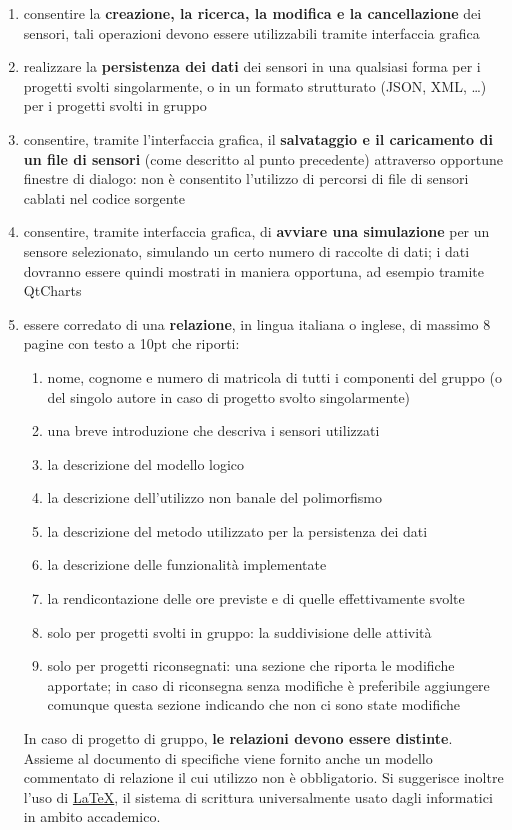 \documentclass[10pt,a4paper,oneside]{article}
\begin{document}
\begin{enumerate}
 \item consentire la \textbf{creazione, la ricerca, la modifica e la cancellazione} dei sensori, tali operazioni devono essere utilizzabili tramite interfaccia grafica
 \item realizzare la \textbf{persistenza dei dati} dei sensori in una qualsiasi forma per i progetti svolti singolarmente, o in un formato strutturato (JSON, XML, \ldots) per i progetti svolti in gruppo
 \item consentire, tramite l'interfaccia grafica, il \textbf{salvataggio e il caricamento di  un file di sensori} (come descritto al punto precedente) attraverso opportune finestre di dialogo: non è consentito l'utilizzo di percorsi di file di sensori cablati nel codice sorgente
 \item consentire, tramite interfaccia grafica, di \textbf{avviare una simulazione} per un sensore selezionato, simulando un certo numero di raccolte di dati; i dati dovranno essere quindi mostrati in maniera opportuna, ad esempio tramite QtCharts
 \item essere corredato di una \textbf{relazione}, in lingua italiana o inglese, di massimo 8 pagine con testo a 10pt che riporti:
 \begin{enumerate}
  \item nome, cognome e numero di matricola di tutti i componenti del gruppo (o del singolo autore in caso di progetto svolto singolarmente)
  \item una breve introduzione che descriva i sensori utilizzati
  \item la descrizione del modello logico
  \item la descrizione dell'utilizzo non banale del polimorfismo
  \item la descrizione del metodo utilizzato per la persistenza dei dati
  \item la descrizione delle funzionalità implementate
  \item la rendicontazione delle ore previste e di quelle effettivamente svolte
  \item solo per progetti svolti in gruppo: la suddivisione delle attività
  \item solo per progetti riconsegnati: una sezione che riporta le modifiche apportate; in caso di riconsegna senza modifiche è preferibile aggiungere comunque questa sezione indicando che non ci sono state modifiche
 \end{enumerate}
 In caso di progetto di gruppo, \textbf{le relazioni devono essere distinte}. Assieme al documento di specifiche viene fornito anche un modello commentato di relazione il cui utilizzo non è obbligatorio. Si suggerisce inoltre l'uso di \href{https://it.wikipedia.org/wiki/LaTeX}{LaTeX}, il sistema di scrittura universalmente usato dagli informatici in ambito accademico.


\end{enumerate}
\end{document}
